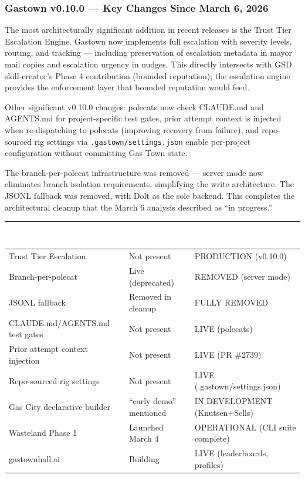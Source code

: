 \documentclass[11pt,letterpaper]{article}
\newcommand{\tableheader}[1]{\textbf{\sffamily\textcolor{white}{#1}}}
\begin{document}
\subsubsection{Gastown v0.10.0 --- Key Changes Since March 6, 2026}

The most architecturally significant addition in recent releases is the Trust Tier Escalation Engine. Gastown now implements full escalation with severity levels, routing, and tracking --- including preservation of escalation metadata in mayor mail copies and escalation urgency in nudges. This directly intersects with GSD skill-creator's Phase 4 contribution (bounded reputation); the escalation engine provides the enforcement layer that bounded reputation would feed.

Other significant v0.10.0 changes: polecats now check CLAUDE.md and AGENTS.md for project-specific test gates, prior attempt context is injected when re-dispatching to polecats (improving recovery from failure), and repo-sourced rig settings via \texttt{.gastown/settings.json} enable per-project configuration without committing Gas Town state.

The branch-per-polecat infrastructure was removed --- server mode now eliminates branch isolation requirements, simplifying the write architecture. The JSONL fallback was removed, with Dolt as the sole backend. This completes the architectural cleanup that the March 6 analysis described as ``in progress.''

\begin{center}
\begin{tabularx}{\textwidth}{L{4cm}L{4cm}X}
\toprule
{}
\tableheader{Feature} & \tableheader{Status March 6} & \tableheader{Status March 26} \\
\midrule
Trust Tier Escalation & Not present & PRODUCTION (v0.10.0) \\
Branch-per-polecat & Live (deprecated) & REMOVED (server mode) \\
JSONL fallback & Removed in cleanup & FULLY REMOVED \\
CLAUDE.md/AGENTS.md test gates & Not present & LIVE (polecats) \\
Prior attempt context injection & Not present & LIVE (PR \#2739) \\
Repo-sourced rig settings & Not present & LIVE (.gastown/settings.json) \\
Gas City declarative builder & ``early demo'' mentioned & IN DEVELOPMENT (Knutsen+Sells) \\
Wasteland Phase 1 & Launched March 4 & OPERATIONAL (CLI suite complete) \\
gastownhall.ai & Building & LIVE (leaderboards, profiles) \\
\bottomrule
\end{tabularx}
\end{center}
\end{document}
